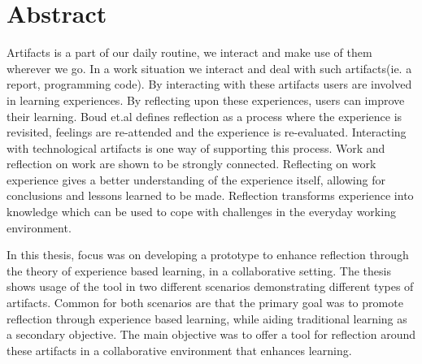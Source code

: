 \chapter*{Abstract}
Artifacts is a part of our daily routine, we interact and make use of them wherever we go. In a work situation we interact and deal with such artifacts(ie. a report, programming code). By interacting with these artifacts users are involved in learning experiences. By reflecting upon these experiences, users can improve their learning. Boud et.al defines reflection as a process where the experience is revisited, feelings are re-attended and the experience is re-evaluated\cite{boudreflection1985}. Interacting with technological artifacts is one way of supporting this process. 
Work and reflection on work are shown to be strongly connected\cite{Schon1983}\cite{Chaiklin1993}. Reflecting on work experience gives a better understanding of the experience itself, allowing for conclusions and lessons learned to be made. 
Reflection transforms experience into knowledge which can be used to cope with challenges in the everyday working environment. 

In this thesis, focus was on developing a prototype to enhance reflection through the theory of experience based learning, in a collaborative setting. The thesis shows usage of the tool in two different scenarios demonstrating different types of artifacts. Common for both scenarios are that the primary goal was to promote reflection through experience based learning, while aiding traditional learning as a secondary objective. 
The main objective was to offer a tool for reflection around these artifacts in a collaborative environment that enhances learning. 